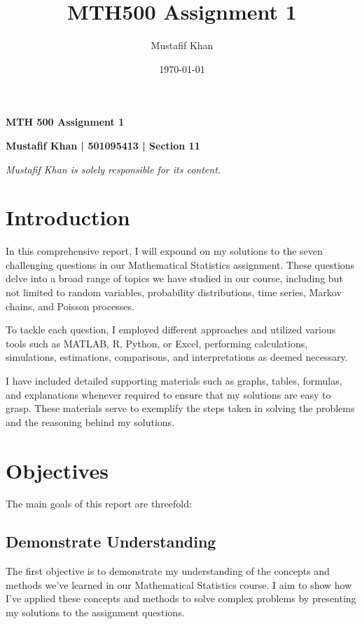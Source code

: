 \documentclass[11pt, letterpaper]{article}
\title{MTH500 Assignment 1}
\author{Mustafif Khan}
\date{\today}
\begin{document}
\begin{titlepage}
	\centering
	\vspace*{1cm}
	\LARGE\textbf{MTH 500 Assignment 1}

	\vspace{1.5cm}
	\Large\textbf{Mustafif Khan | 501095413 | Section 11}

	\vspace{1.5cm}
	\large\textit{Mustafif Khan is solely responsible for its content.}
\end{titlepage}

\newpage
\section{Introduction}

In this comprehensive report, I will expound on my solutions to the seven
challenging questions in our Mathematical Statistics assignment. These
questions delve into a broad range of topics we have studied in our course,
including but not limited to random variables, probability distributions, time
series, Markov chains, and Poisson processes.

To tackle each question, I employed different approaches and utilized various
tools such as MATLAB, R, Python, or Excel, performing calculations,
simulations, estimations, comparisons, and interpretations as deemed necessary.

I have included detailed supporting materials such as graphs, tables, formulas,
and explanations whenever required to ensure that my solutions are easy to
grasp. These materials serve to exemplify the steps taken in solving the
problems and the reasoning behind my solutions.

\section{Objectives}

The main goals of this report are threefold:

\subsection{Demonstrate Understanding}
The first objective is to demonstrate my understanding of the concepts and
methods we've learned in our Mathematical Statistics course. I aim to show how
I've applied these concepts and methods to solve complex problems by presenting
my solutions to the assignment questions.
\end{document}
